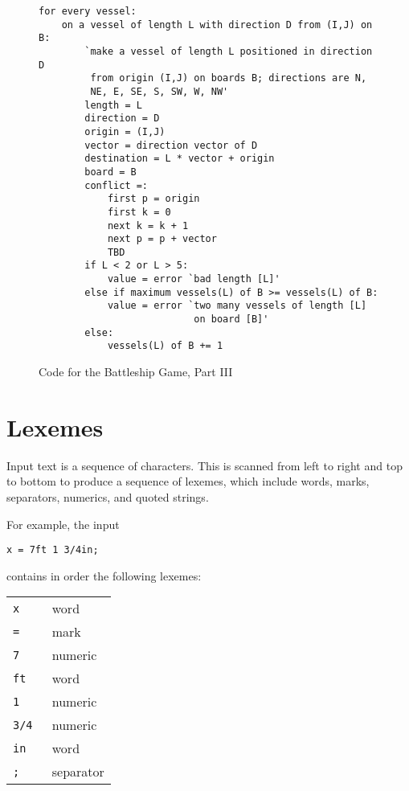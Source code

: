 \documentclass[12pt]{article}
\newlength{\figurewidth}
\newenvironment{boxedfigure}[1][!btp]%
	{\begin{figure*}[#1]
	 \begin{lrbox}{\figurebox}
	 \begin{minipage}{\figurewidth}

	 \vspace*{1ex}}%
	{
	 \vspace*{1ex}

	 \end{minipage}
	 \end{lrbox}
	 \begin{center}
	 \fbox{\hspace*{0.1in}\usebox{\figurebox}\hspace*{0.1in}}
	 \end{center}
	 \end{figure*}}
\begin{document}
\begin{boxedfigure}

\begin{verbatim}
for every vessel:
    on a vessel of length L with direction D from (I,J) on B:
        `make a vessel of length L positioned in direction D
         from origin (I,J) on boards B; directions are N,
         NE, E, SE, S, SW, W, NW'
        length = L
        direction = D
        origin = (I,J)
        vector = direction vector of D
        destination = L * vector + origin
        board = B
        conflict =:
            first p = origin
            first k = 0
            next k = k + 1
            next p = p + vector
            TBD
        if L < 2 or L > 5:
            value = error `bad length [L]'
        else if maximum vessels(L) of B >= vessels(L) of B:
            value = error `two many vessels of length [L]
                           on board [B]'
        else:
            vessels(L) of B += 1
\end{verbatim}

\caption{Code for the Battleship Game, Part III}
\label{CODE-FOR-BATTLESHIP-3}
\end{boxedfigure}

\newpage

\section{Lexemes}

Input text is a sequence of characters.  This is scanned from
left to right and top to bottom to produce a sequence of lexemes,
which include words, marks, separators, numerics, and quoted strings.

For example, the input
\begin{center}
\verb|x = 7ft 1 3/4in;|
\end{center}
contains in order the following lexemes:
\begin{center}
\begin{tabular}{ll}
\tt x	& word \\
\tt =	& mark \\
\tt 7	& numeric \\
\tt ft	& word \\
\tt 1	& numeric \\
\tt 3/4	& numeric \\
\tt in	& word \\
\tt ;	& separator \\
\end{tabular}
\end{center}
\end{document}

